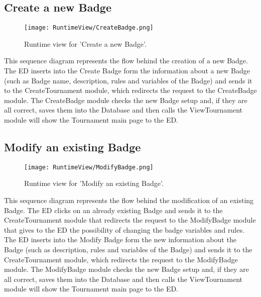 \subsection{Create a new Badge}
\begin{figure}[H]
    \begin{center}
        \texttt{[image: RuntimeView/CreateBadge.png]}
        \caption{Runtime view for 'Create a new Badge'.}
        \label{fig:runtime_createbadge}%
    \end{center}
\end{figure}
This sequence diagram represents the flow behind the creation of a new Badge. The ED inserts into the Create Badge form the information about a new Badge (such as Badge name, description, rules and variables of the Badge) and sends it to the CreateTournament module, which redirects the request to the CreateBadge module. The CreateBadge module checks the new Badge setup and, if they are all correct, saves them into the Database and then calls the ViewTournament module will show the Tournament main page to the ED.

\subsection{Modify an existing Badge}
\begin{figure}[H]
    \begin{center}
        \texttt{[image: RuntimeView/ModifyBadge.png]}
        \caption{Runtime view for 'Modify an existing Badge'.}
        \label{fig:runtime_modifybadge}%
    \end{center}
\end{figure}
This sequence diagram represents the flow behind the modification of an existing Badge. The ED clicks on an already existing Badge and sends it to the CreateTournament module that redirects the request to the ModifyBadge module that gives to the ED the possibility of changing the badge variables and rules. The ED inserts into the Modify Badge form the new information about the Badge (such as description, rules and variables of the Badge) and sends it to the CreateTournament module, which redirects the request to the ModifyBadge module. The ModifyBadge module checks the new Badge setup and, if they are all correct, saves them into the Database and then calls the ViewTournament module will show the Tournament main page to the ED.





